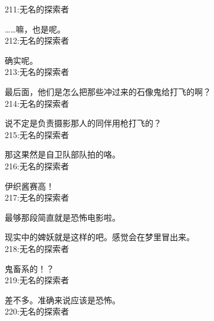 211:无名的探索者

……嘛，也是呢。\\

212:无名的探索者

确实呢。\\

213:无名的探索者

最后面，他们是怎么把那些冲过来的石像鬼给打飞的啊？\\

214:无名的探索者

说不定是负责摄影那人的同伴用枪打飞的？\\

215:无名的探索者

那这果然是自卫队部队拍的咯。\\

216:无名的探索者

伊织酱赛高！\\

217:无名的探索者

最够那段简直就是恐怖电影啦。

现实中的婢妖就是这样的吧。感觉会在梦里冒出来。\\

218:无名的探索者

鬼畜系的！？\\

219:无名的探索者

差不多。准确来说应该是恐怖。\\

220:无名的探索者

